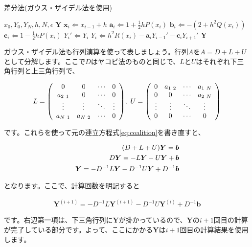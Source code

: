 \begin{algorithm}
\label{al:difference-gauss-seidel}
\caption{差分法(ガウス・ザイデル法を使用)}
\begin{algorithmic}
\REQUIRE $x_0,Y_0,Y_N,h,N,\epsilon$
\ENSURE $\boldsymbol{Y}$
    \STATE $\boldsymbol{x}_i\Leftarrow x_{i-1}+h$
    \STATE $\boldsymbol{a}_i\Leftarrow 1+\frac{1}{2}hP(x_i)$
    \STATE $\boldsymbol{b}_i\Leftarrow -(2+h^2Q(x_i))$
    \STATE $\boldsymbol{c}_i\Leftarrow 1-\frac{1}{2}hP(x_i)$
\ENDFOR
{}
        \STATE $Y_i'\Leftarrow Y_i$
        \STATE $Y_i\Leftarrow h^2R(x_i)-\boldsymbol{a}_iY_{i-1}'-\boldsymbol{c}_iY_{i+1}'$
    \ENDFOR
\ENDWHILE
\RETURN $\boldsymbol{Y}$
\end{algorithmic}
\end{algorithm}

ガウス・ザイデル法も行列演算を使って表しましょう。行列$A$を$A=D+L+U$として分解します。ここで$D$はヤコビ法のものと同じで、$L$と$U$はそれぞれ下三角行列と上三角行列で、

\begin{eqnarray}
    L=\pqty{\begin{array}{cccc}
        0 & 0 & \cdots & 0 \\
        a_{2\ 1} & 0 & \cdots & 0 \\
        \vdots & \vdots & \ddots & \vdots \\
        a_{N\ 1} & a_{N\ 2} & \cdots & 0
        \end{array}},\ 
    U=\pqty{\begin{array}{cccc}
        0 & a_{1\ 2} & \cdots & a_{1\ N} \\
        0 & 0 & \cdots & a_{2\ N} \\
        \vdots & \vdots & \ddots & \vdots \\
        0 & 0 & \cdots & 0
        \end{array}}
\end{eqnarray}

\noindent
です。これらを使って元の連立方程式\ref{eq:coalition}を書き直すと、

\begin{eqnarray}
    (D+L+U)\boldsymbol{Y}=\boldsymbol{b} \\
    D\boldsymbol{Y}=-L\boldsymbol{Y}-U\boldsymbol{Y}+\boldsymbol{b} \nonumber \\
    \boldsymbol{Y}=-D^{-1}L\boldsymbol{Y}-D^{-1}U\boldsymbol{Y}+D^{-1}\boldsymbol{b} \setcounter{equation}{76}
\end{eqnarray}

\noindent
となります。ここで、計算回数を明記すると

\begin{eqnarray}
    \boldsymbol{Y}^{(i+1)}=-D^{-1}L\boldsymbol{Y}^{(i+1)}-D^{-1}U\boldsymbol{Y}^{(i)}+D^{-1}\boldsymbol{b}
\end{eqnarray}

\noindent
です。右辺第一項は、下三角行列に$\boldsymbol{Y}$が掛かっているので、$\boldsymbol{Y}$の$i+1$回目の計算が完了している部分です。よって、ここにかかる$\boldsymbol{Y}$は$i+1$回目の計算結果を使用します。






\clearpage